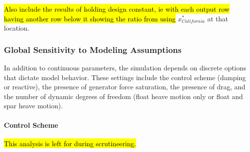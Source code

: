 \hl{Also include the results of holding design constant, ie with each output row having another row below it showing the ratio from using} $x^*_{California}$ at that location.


\subsubsection{Global Sensitivity to Modeling Assumptions}
\label{sec:sensitivity-model-assumptions}
In addition to continuous parameters, the simulation depends on discrete options that dictate model behavior.
These settings include the control scheme (damping or reactive), the presence of generator force saturation, the presence of drag, and the number of dynamic degrees of freedom (float heave motion only or float and spar heave motion).

\paragraph{Control Scheme}
\hl{This analysis is left for during scrutineering.}

